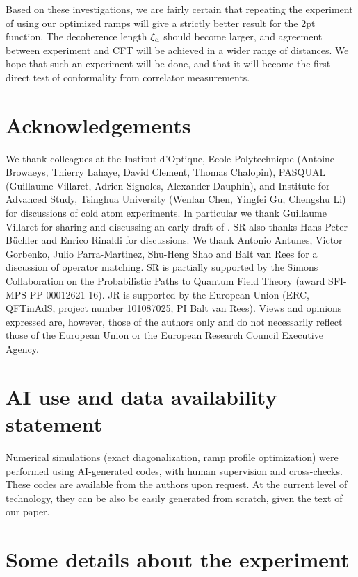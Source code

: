 \documentclass[a4paper,12pt]{article}
\theoremstyle{remark}
\theoremstyle{theorem}
\begin{document}
Based on these investigations, we are fairly certain that repeating the experiment of \cite{Fang:2024uyf} using our optimized ramps will give a strictly better result for the 2pt function. The decoherence length $\xi_{\rm d}$ should become larger, and agreement between experiment and CFT will be achieved in a wider range of distances. We hope that such an experiment will be done, and that it will become the first direct test of conformality from correlator measurements.

\section*{Acknowledgements}

We thank colleagues at the Institut d'Optique, Ecole Polytechnique (Antoine
Browaeys, Thierry Lahaye, David Clement, Thomas Chalopin), PASQUAL (Guillaume
Villaret, Adrien Signoles, Alexander Dauphin), and Institute for Advanced
Study, Tsinghua University (Wenlan Chen, Yingfei Gu, Chengshu Li) for
discussions of cold atom experiments. In particular we thank Guillaume Villaret for sharing and discussing an early draft of \cite{Dalyac:2026jpu}. SR also thanks Hans Peter B{\"u}chler
and Enrico Rinaldi for discussions. We thank Antonio Antunes, Victor Gorbenko, Julio Parra-Martinez, Shu-Heng Shao and Balt van Rees for a discussion of operator matching. SR is partially supported by the Simons
Collaboration on the Probabilistic Paths to Quantum Field Theory (award
SFI-MPS-PP-00012621-16).
JR is supported by the European Union (ERC, QFTinAdS, project number 101087025, PI Balt van Rees). Views and opinions expressed are, however, those of the authors only and do not necessarily reflect those of the European Union or the European Research Council Executive Agency.

\section*{AI use and data availability statement}

Numerical simulations (exact diagonalization, ramp profile optimization) were performed using AI-generated codes, with human supervision and cross-checks. These codes are available from the authors upon request. At the current level of technology, they can be also be easily generated from scratch, given the text of our paper.

\appendix

\section{Some details about the experiment \cite{Fang:2024uyf}}
\label{sec:Yao-details}
\end{document}
